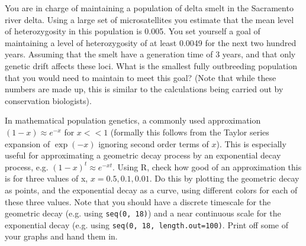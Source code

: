 
\begin{question} You are in charge of maintaining a population of delta smelt
  in the Sacramento river delta. Using a large set of microsatellites you
  estimate that the mean level of heterozygosity in this population is 0.005.
  You set yourself a goal of maintaining a level of heterozygosity of at least
  0.0049 for the next two hundred years. Assuming that the smelt have a
  generation time of 3 years, and that only genetic drift affects these loci.
  What is the smallest fully outbreeding population that you would need to
maintain to meet this goal?  (Note that while these numbers are made up, this
is similar to the calculations being carried out by conservation biologists).
\end{question}

\begin{question} \label{geo_question} In mathematical population genetics, a
  commonly used approximation $(1-x) \approx e^{-x}$ for $x << 1$ (formally
  this follows from the Taylor series expansion of $\exp(-x)$ ignoring second
  order terms of $x$).  This is especially useful for approximating a geometric
  decay process by an exponential decay process, e.g. $(1 - x)^t \approx
  e^{-xt}$. Using R, check how good of an approximation this is for three
  values of x, $x = 0.5, 0.1, 0.01$. Do this by plotting the geometric decay as
  points, and the exponential decay as a curve, using different colors for each
  of these three values. Note that you should have a discrete timescale for the
  geometric decay (e.g. using \texttt{seq(0, 18)}) and a near continuous scale
  for the exponential decay (e.g. using \texttt{seq(0, 18, length.out=100)}.
  Print off some of your graphs and hand them in. 


\end{question}

